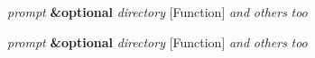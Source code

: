 \documentclass[12pt,onecolumn]{article}
\begin{document}
\blindtext


\noindent
{}
  \usebox{\funcname}\emph{prompt} \textbf {\&optional} \emph{directory}
  \hfill [Function]
\hspace*{\wd\funcname} \emph{and} \emph{others} \emph{too}
\begin{doc-string}
\blindtext
\end{doc-string}



\noindent
{}
  \usebox{\funcname}\emph{prompt} \textbf {\&optional} \emph{directory}
  \hfill [Function]
\hspace*{\wd\funcname} \emph{and} \emph{others} \emph{too}
\begin{doc-string}
\blindtext
\end{doc-string}

\blindtext

\printindex
\end{document}
